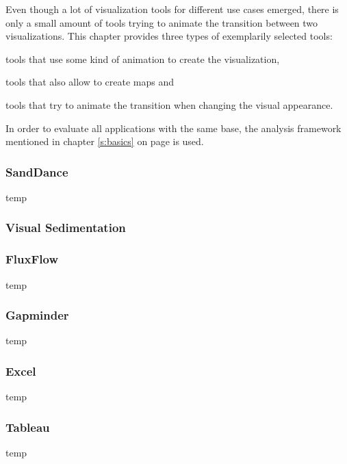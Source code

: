 Even though a lot of visualization tools for different use cases emerged, there is only a small amount of tools trying to animate the transition between two visualizations. This chapter provides three types of exemplarily selected tools:

\begin{enumerate*}
\item tools that use some kind of animation to create the visualization,
\item tools that also allow to create maps and
\item tools that try to animate the transition when changing the visual appearance.
\end{enumerate*}

In order to evaluate all applications with the same base, the analysis framework mentioned in chapter \ref{s:basics} on page \pageref{s:basics} is used.

\subsubsection{SandDance}


temp

\subsubsection{Visual Sedimentation}




\subsubsection{FluxFlow}
temp 

\subsubsection{Gapminder}
temp

\subsubsection{Excel}
temp

\subsubsection{Tableau}
temp 


